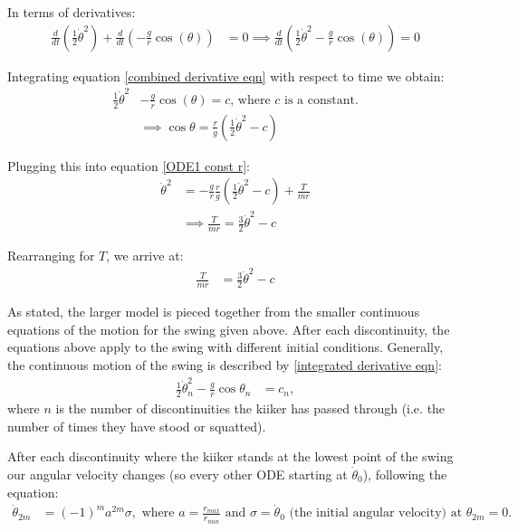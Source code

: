 \documentclass[12pt]{article}
\begin{document}
In terms of derivatives:
\begin{align}
    \frac{d}{dt}(\frac{1}{2}\dot{\theta}^2) + \frac{d}{dt}(-\frac{g}{r}\cos(\theta)) &= 0
    \implies \frac{d}{dt}(\frac{1}{2}\dot{\theta}^2 - \frac{g}{r}\cos(\theta)) = 0 \label{combined derivative eqn}
\end{align}

Integrating equation \ref{combined derivative eqn} with respect to time we obtain:
\begin{align}
    \frac{1}{2}\dot{\theta}^2 &- \frac{g}{r}\cos(\theta) = c \label{integrated derivative eqn}\text{,  where $c$ is a constant.}
    \\&\implies{\cos{\theta} = \frac{r}{g}(\frac{1}{2}\dot{\theta}^2 - c)}
\end{align}

Plugging this into equation \ref{ODE1 const r}:
\begin{align}
    \dot{\theta}^2 &= -\frac{g}{r} \frac{r}{g}(\frac{1}{2}\dot{\theta}^2 - c) + \frac{T}{mr}
    \\&\implies \frac{T}{mr} = \frac{3}{2}\dot{\theta}^2 - c
\end{align}

Rearranging for $T$, we arrive at:
\begin{align}
    \frac{T}{mr} &= \frac{3}{2}\dot{\theta}^2 - c
    \label{tension eqn}
\end{align}

As stated, the larger model is pieced together from the smaller continuous equations of the motion for the swing given above.
After each discontinuity, the equations above apply to the swing with different initial conditions.
Generally, the continuous motion of the swing is described by \ref{integrated derivative eqn}:
\begin{align}
    \frac{1}{2}\dot{\theta}^2_n - \frac{g}{r}\cos{\theta_n}&= c_n,
    \label{coninuous motion eqn}
\end{align}
where $n$ is the number of discontinuities the kiiker has passed through (i.e. the number of times they have stood or squatted).

After each discontinuity where the kiiker stands at the lowest point of the swing our angular velocity changes (so every other ODE starting at $\dot{\theta}_0$), following the equation:
\begin{align}
    \dot{\theta}_{2m} &= (-1)^{m} a^{2m}\sigma,
    \label{discontinuity reln}
    \text{ where $a = \frac{r_{max}}{r_{min}}$ and $\sigma = \dot{\theta}_0$ (the initial angular velocity) at } \theta_{2m} = 0.
\end{align}
\end{document}

